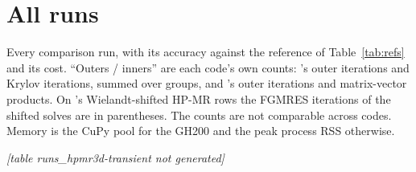 \section{All runs}
\label{sec:runs}

Every comparison run, with its accuracy against the reference of
Table~\ref{tab:refs} and its cost. ``Outers / inners'' are each code's own
counts: \garnet's outer iterations and Krylov iterations, summed over groups,
and \ffn's outer iterations and matrix-vector products. On \garnet's
Wielandt-shifted HP-MR rows the FGMRES iterations of the shifted solves are
in parentheses. The counts are not comparable across codes. Memory is the CuPy pool for the GH200 and the peak
process RSS otherwise.

\begin{table}[h]\caption{IAEA-3D.}\label{tab:runs-iaea}\end{table}
\begin{table}[h]\caption{3-D Langenbuch at $t=0$.}\label{tab:runs-lmw}\end{table}
\begin{table}[h]\caption{HP-MR, steady.}\label{tab:runs-hpmr}\end{table}

\clearpage
\newcommand{\transientrunscaption}{HP-MR transient. Errors: the largest
$|P/P_\mathrm{ref}-1|$ over the run (max) and at $t = 2$~s (end). Schemes:
\ffn's Semi-Implicit-Euler (SI-Euler) and Semi-Implicit-Exponential
(SI-Exp); \garnet's fixed-step BDF2 with the fixed-point step, or with the
monolithic step (mono); aBDF$q$ ($\epsilon$): adaptive step with automatic
order up to $q$ and per-step error tolerance $\epsilon$, with $\Delta t$ the
range of accepted steps. Steps: the accepted time steps of the march
(rejected ones in parentheses). Inners: its inner iterations, \garnet's
Krylov iterations and \ffn's GMRES iterations (one linear solve per step,
plus a null step at $t = 0$).}
\begingroup
\setlength{\LTcapwidth}{\textwidth}
\setlength{\tabcolsep}{2.5pt}
%
  {\begin{center}\emph{[table runs\_hpmr3d-transient not generated]}\end{center}}
\endgroup
